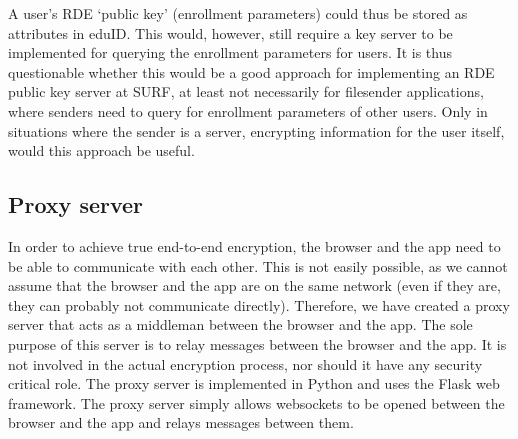A user's RDE `public key' (enrollment parameters) could thus be stored as attributes in eduID.
This would, however, still require a key server to be implemented for querying the enrollment parameters for users.
It is thus questionable whether this would be a good approach for implementing an RDE public key server at SURF, at least not necessarily for filesender applications, where senders need to query for enrollment parameters of other users.
Only in situations where the sender is a server, encrypting information for the user itself, would this approach be useful.

\subsection{Proxy server}\label{subsec:proxy-server}
In order to achieve true end-to-end encryption, the browser and the app need to be able to communicate with each other.
This is not easily possible, as we cannot assume that the browser and the app are on the same network (even if they are, they can probably not communicate directly).
Therefore, we have created a proxy server that acts as a middleman between the browser and the app.
The sole purpose of this server is to relay messages between the browser and the app.
It is not involved in the actual encryption process, nor should it have any security critical role.
The proxy server is implemented in Python and uses the Flask web framework.
The proxy server simply allows websockets to be opened between the browser and the app and relays messages between them.

